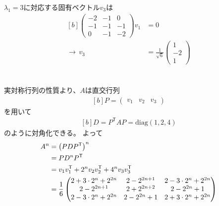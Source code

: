 \documentclass[../ap_2013.tex]{subfiles}
\begin{document}
\(\lambda_1=3\)に対応する固有ベクトル\(v_3\)は
\begin{equation}\begin{aligned}[b]
    \begin{pmatrix}
        -2 & -1 & 0\\
        -1 & -1 & -1\\
        0 & -1 & -2
    \end{pmatrix}v_1&=0\\
    \rightarrow\, v_3 &=\frac{1}{\sqrt{6}} \begin{pmatrix}
        1\\-2\\1
    \end{pmatrix}
\end{aligned}\end{equation}

\section{}
実対称行列の性質より、\(A\)は直交行列
\begin{equation}\begin{aligned}[b]
    P = \begin{pmatrix}
        v_1 & v_2 & v_3
    \end{pmatrix}
\end{aligned}\end{equation}
を用いて
\begin{equation}\begin{aligned}[b]
    D = P^\mathsf{T}AP = \text{diag}(1, 2, 4)
\end{aligned}\end{equation}
のように対角化できる。
よって
\begin{equation}\begin{aligned}[b]
    A^n &= \qty(PDP^\mathsf{T})^n\\
    &= PD^nP^\mathsf{T}\\
    &=v_1v_1^\mathsf{T}+2^nv_2v_2^\mathsf{T}+4^nv_3v_3^\mathsf{T}\\
    &=\frac{1}{6}\begin{pmatrix}
        2+3\cdot 2^n+2^{2n} & 2-2^{2n+1} & 2-3\cdot 2^n+2^{2n}\\
        2-2^{2n+1} & 2+2^{2n+2} & 2-2^{2n}+1\\
        2-3\cdot 2^n+2^{2n} & 2-2^{2n}+1 & 2+3\cdot 2^n+2^{2n}
    \end{pmatrix}
\end{aligned}\end{equation}
\end{document}
